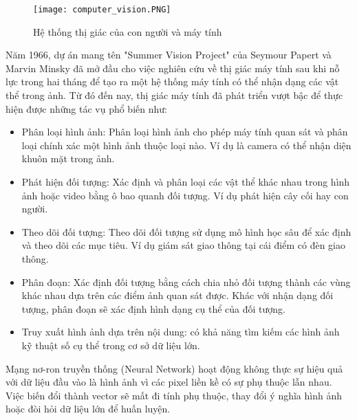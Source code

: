 \documentclass[../the.tex]{subfiles}
\begin{document}
\begin{figure}[H]
	\centering
	\texttt{[image: computer\_vision.PNG]}
	\caption{Hệ thống thị giác của con người và máy tính}
	\label{fig:computer_vision}
\end{figure}

{\fontsize{13}{12} \selectfont

Năm 1966, dự án mang tên "Summer Vision Project" \cite{Papert1966TheSV} của Seymour Papert và Marvin Minsky  đã mở đầu cho việc nghiên cứu về thị giác máy tính sau khi nỗ lực trong hai tháng để tạo ra một hệ thống máy tính có thể
nhận dạng các vật thể trong ảnh. Từ đó đến nay, thị giác máy tính đã phát triển vượt bậc để thực hiện được những tác vụ phổ biến như:

\begin{itemize}
	\item Phân loại hình ảnh: Phân loại hình ảnh cho phép máy tính quan sát và phân loại chính xác một hình ảnh thuộc loại nào.
	      Ví dụ là camera có thể nhận diện khuôn mặt trong ảnh.

	\item Phát hiện đối tượng: Xác định và phân loại các vật thể khác nhau trong hình ảnh hoặc video bằng ô bao quanh đối tượng. Ví dụ phát hiện cây cối hay con người.

	\item Theo dõi đối tượng: Theo dõi đối tượng sử dụng mô hình học sâu để xác định và theo dõi các mục tiêu. Ví dụ giám sát giao thông tại cái điểm có đèn giao thông.

	\item Phân đoạn: Xác định đối tượng bằng cách chia nhỏ đối tượng thành các vùng khác nhau dựa trên các điểm ảnh quan sát được. Khác với nhận dạng đối tượng, phân đoạn sẽ xác định hình dạng cụ thể của đối tượng.

	\item Truy xuất hình ảnh dựa trên nội dung: có khả năng tìm kiếm các hình ảnh kỹ thuật số cụ thể trong cơ sở dữ liệu lớn.
\end{itemize}

}

{\fontsize{13}{12} \selectfont

Mạng nơ-ron truyền thống (Neural Network) hoạt động không thực sự hiệu quả với dữ liệu đầu vào là hình ảnh vì các pixel liền kề có sự phụ thuộc lẫn nhau.
Việc biến đổi thành vector sẽ mất đi tính phụ thuộc, thay đổi ý nghĩa hình ảnh hoặc đòi hỏi dữ liệu lớn để huấn luyện.

}
\end{document}
